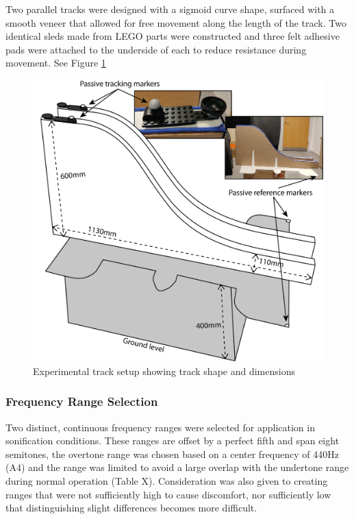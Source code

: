 \documentclass[10pt,a4paper,onecolumn]{article}
\begin{document}
Two parallel tracks were designed with a sigmoid curve shape, surfaced with a smooth veneer that allowed for free movement along the length of the track. Two identical sleds made from LEGO parts were constructed and three felt adhesive pads were attached to the underside of each to reduce resistance during movement. See Figure \ref{fig:track-setup}

\begin{figure}

{\centering \includegraphics[width=1\linewidth]{figures/track_dimensions} 

}

\caption{Experimental track setup showing track shape and dimensions}\label{fig:track-setup}
\end{figure}

\hypertarget{frequency-range-selection}{%
\subsubsection{Frequency Range Selection}\label{frequency-range-selection}}

Two distinct, continuous frequency ranges were selected for application in sonification conditions. These ranges are offset by a perfect fifth and span eight semitones, the overtone range was chosen based on a center frequency of 440Hz (A4) and the range was limited to avoid a large overlap with the undertone range during normal operation (Table X). Consideration was also given to creating ranges that were not sufficiently high to cause discomfort, nor sufficiently low that distinguishing slight differences becomes more difficult.
\end{document}
